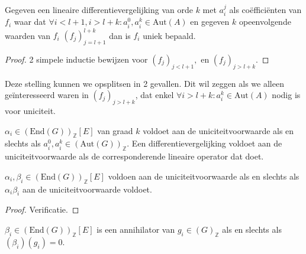 \documentclass[a4paper,12pt]{article}
\begin{document}


\begin{theorem}[uniciteitvoorwaarde]
    \label{uniciteitvoorwaarde}
    Gegeven een lineaire differentievergelijking van orde $k$ met $a^j_i$ als coëfficiënten van $f_i$ waar dat
    $\forall i< l+1 , i> l+k:a_i^0,a_i^k \in \text{Aut}(A)$ en gegeven $k$
    opeenvolgende waarden van $f_i$ $(f_j)_{j=l+1}^{l+k}$ dan is $f_i$ uniek bepaald.
\end{theorem}
\begin{proof}
    2 simpele inductie bewijzen voor $(f_j)_{j< l+1}, $ en $(f_j)_{ j> l+k} $.
\end{proof}

\begin{remark}
    Deze stelling kunnen we opsplitsen in 2 gevallen.
    Dit wil zeggen als we alleen geïnteresseerd waren in $(f_j)_{ j> l+k}$, dat enkel
    $\forall i> l+k:a_i^k \in \text{Aut}(A)$ nodig is voor uniciteit.
\end{remark}

\begin{definition}[uniciteitvoorwaarde]
    $\alpha_i \in (\text{End}(G))_\mathbb{Z}[E]$ van graad $k$ voldoet aan de uniciteitvoorwaarde als en
    slechts als
    $
        a_i^0,a_i^k \in (\text{Aut}(G))_{\mathbb{Z}}.
    $
    Een differentievergelijking voldoet aan de uniciteitvoorwaarde als de corresponderende lineaire operator
    dat doet.
\end{definition}



\begin{lemma}
    \label{lemma unciteit voorwaarde}
    $\alpha_i, \beta_i \in (\text{End}(G))_\mathbb{Z}[E]$ voldoen aan de uniciteitvoorwaarde
    als en slechts als $\alpha_i\beta_i$ aan de uniciteitvoorwaarde voldoet.
\end{lemma}

\begin{proof}
    Verificatie.
\end{proof}

\begin{definition}[annihilator]
    $\beta_i \in (\text{End}(G))_\mathbb{Z}[E]$ is een annihilator van $g_i \in (G)_{\mathbb{Z}}$
    als en slechts als
    $
        (\beta_i)(g_i) = 0.
    $
\end{definition}
\end{document}
